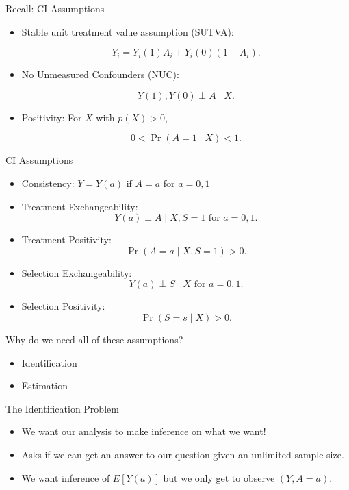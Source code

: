 \documentclass[handout]{beamer} %
\begin{document}
\begin{frame}{Recall: CI Assumptions}

\begin{itemize}
    \item Stable unit treatment value assumption (SUTVA):

      \[Y_i = Y_i(1) A_i + Y_i(0) (1 - A_i).\]

    \item No Unmeasured Confounders (NUC):

      \[Y(1), Y(0) \perp A \mid X.\]

    \item Positivity: For $X$ with $p(X) > 0$,

      \[0 < \Pr(A = 1 \mid X) < 1.\]

\end{itemize}

\end{frame}

\begin{frame}{CI Assumptions}

\begin{itemize}
    \item Consistency: $Y = Y(a)$ if $A = a$ for $a = 0, 1$
    \item Treatment Exchangeability: 
      \[Y(a) \perp A \mid X, S = 1 \text{ for } a = 0, 1.\]
    \item Treatment Positivity: 
      \[\Pr(A = a \mid X, S = 1) > 0.\]
    \item Selection Exchangeability:
      \[Y(a) \perp S \mid X \text{ for } a = 0, 1.\]
    \item Selection Positivity: 
      \[\Pr(S = s \mid X) > 0.\]
\end{itemize}

\end{frame}

\begin{frame}{Why do we need all of these assumptions?}

\begin{itemize}
    \item Identification
    \item Estimation
\end{itemize}

\end{frame}

\begin{frame}{The Identification Problem}

\begin{itemize}
    \item We want our analysis to make inference on what we want!
    \item Asks if we can get an answer to our question given an unlimited 
      sample size.
    \item We want inference of $E[Y(a)]$ but we only get to observe $(Y, A = a)$.
\end{itemize}

\end{frame}
\end{document}
